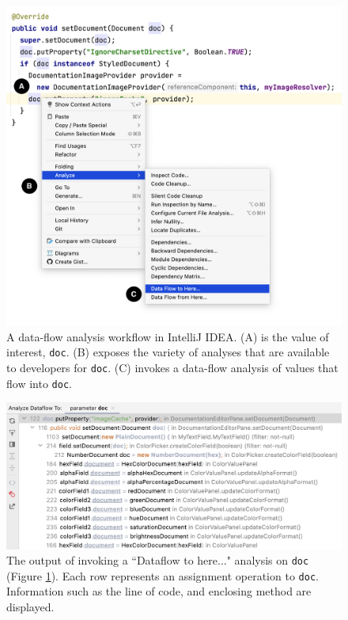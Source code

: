 
\begin{figure}[ht]
\centering
\includegraphics[width=\textwidth]{./figs/intellij-dataflow.png}
\caption{
  A data-flow analysis workflow in IntelliJ IDEA. (A) is the value of
  interest, \texttt{doc}. (B) exposes the variety of analyses that are
  available to developers for \texttt{doc}. (C) invokes a data-flow analysis
  of values that flow into \texttt{doc}.
}
\label{fig:IntelliJDataflow}
\end{figure}

\begin{figure}[ht]
\centering
\includegraphics[width=\textwidth]{./figs/intellij-dataflow-result.png}
\caption{
  The output of invoking a ``Dataflow to here..." analysis on \texttt{doc}
  (Figure \ref{fig:IntelliJDataflow}). Each row represents an assignment
  operation to \texttt{doc}. Information such as the line of code, and 
  enclosing method are displayed.
}
\label{fig:IntelliJDataflowResult}
\end{figure}

